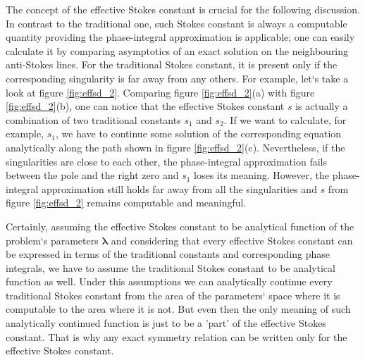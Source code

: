 \documentclass[atmp]{ipart_v1}
\def\lmbd{\bm{\lambda}}
\newcommand\fref[1]{figure \ref{#1}}
\begin{document}
The concept of the effective Stokes constant is crucial for the following discussion. 
In contrast to the traditional one, such Stokes constant is always a computable quantity
providing the phase-integral approximation is applicable; one 
can easily calculate it by comparing asymptotics of an exact solution on the 
neighbouring anti-Stokes lines. For the traditional Stokes constant, it is present only if the
corresponding singularity is far away from any others. 
For example, let`s take a look at \fref{fig:effsd_2}. Comparing \fref{fig:effsd_2}(a) with \fref{fig:effsd_2}(b),
one can notice that the effective Stokes constant $s$ is actually a combination of
two traditional constants $s_1$ and $s_2$. If we want to calculate, for example, $s_1$, we have to continue 
some solution of the corresponding equation analytically along the path shown in  \fref{fig:effsd_2}(c). Nevertheless,
if the singularities are close to each other, the phase-integral approximation fails between the pole
and the right zero and $s_1$ loses its meaning. However, the phase-integral approximation still holds
far away from all the singularities and $s$ from \fref{fig:effsd_2} remains computable and meaningful. 

Certainly, assuming the effective Stokes constant to be analytical function of the problem`s parameters $\lmbd$
and considering that every effective Stokes constant can be expressed in terms of the traditional constants 
and corresponding phase integrals, we have to assume the traditional Stokes constant to be analytical
function as well. Under this assumptions we can analytically continue every traditional Stokes constant
from the area of the parameters` space where it is computable to the area where it is not. But even then
the only meaning of such analytically continued function is just to be a 'part' of the effective Stokes constant.
That is why any exact symmetry relation can be written only for the effective Stokes constant.
\end{document}
